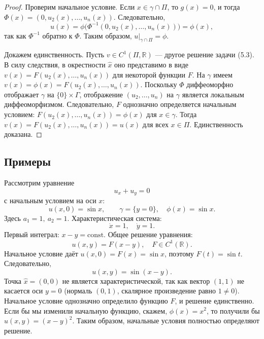 \begin{proof}
    Проверим начальное условие. Если \(x\in\gamma\cap\Pi\), то \(g(x)=0\), и тогда \(\Phi(x)=(0,u_2(x),\dots,u_n(x))\). Следовательно,
    \[
    u(x)=\phi\bigl(\Phi^{-1}(0,u_2(x),\dots,u_n(x))\bigr)=\phi(x),
    \]
    так как \(\Phi^{-1}\) обратно к \(\Phi\). Таким образом, \(u|_{\gamma\cap\Pi}=\phi\).

    Докажем единственность. Пусть \(v\in C^1(\Pi,\mathbb{R})\) — другое решение задачи (5.3). В силу следствия, в окрестности \(\hat{x}\) оно представимо в виде \(v(x)=F(u_2(x),\dots,u_n(x))\) для некоторой функции \(F\). На \(\gamma\) имеем \(v(x)=\phi(x)=F(u_2(x),\dots,u_n(x))\). Поскольку \(\Phi\) диффеоморфно отображает \(\gamma\) на \(\{0\}\times\Gamma\), отображение \((u_2,\dots,u_n)\) на \(\gamma\) является локальным диффеоморфизмом. Следовательно, \(F\) однозначно определяется начальным условием: \(F(u_2(x),\dots,u_n(x))=\phi(x)\) для \(x\in\gamma\). Тогда \(v(x)=F(u_2(x),\dots,u_n(x))=u(x)\) для всех \(x\in\Pi\). Единственность доказана.
\end{proof}

\subsection{Примеры}

\begin{example}
    Рассмотрим уравнение
    \[
    u_x + u_y = 0
    \]
    с начальным условием на оси \(x\):
    \[
    u(x,0) = \sin x,\qquad \gamma = \{y=0\},\quad \phi(x) = \sin x.
    \]
    Здесь \(a_1 = 1,\ a_2 = 1\). Характеристическая система:
    \[
    \dot x = 1,\quad \dot y = 1.
    \]
    Первый интеграл: \(x - y = \text{const}\). Общее решение уравнения:
    \[
    u(x,y) = F(x-y),\quad F\in C^1(\mathbb{R}).
    \]
    Начальное условие даёт \(u(x,0)=F(x)=\sin x\), поэтому \(F(t)=\sin t\). Следовательно,
    \[
    u(x,y) = \sin(x-y).
    \]
    Точка \(\hat{x}=(0,0)\) не является характеристической, так как вектор \((1,1)\) не касается оси \(y=0\) (нормаль \((0,1)\), скалярное произведение равно \(1\neq0\)). Начальное условие однозначно определило функцию \(F\), и решение единственно. Если бы мы изменили начальную функцию, скажем, \(\phi(x)=x^2\), то получили бы \(u(x,y)=(x-y)^2\). Таким образом, начальные условия полностью определяют решение.
\end{example}


